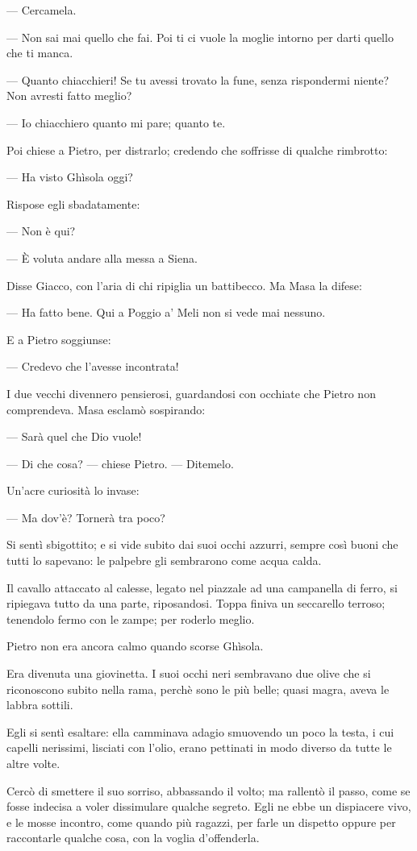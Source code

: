 — Cercamela.

— Non sai mai quello che fai. Poi ti ci vuole la moglie intorno per darti quello che ti manca.

— Quanto chiacchieri! Se tu avessi trovato la fune, senza rispondermi niente? Non avresti fatto meglio?

— Io chiacchiero quanto mi pare; quanto te.

Poi chiese a Pietro, per distrarlo; credendo che soffrisse di qualche rimbrotto:

— Ha visto Ghìsola oggi?

Rispose egli sbadatamente:

— Non è qui?

— È voluta andare alla messa a Siena.

Disse Giacco, con l’aria di chi ripiglia un battibecco. Ma Masa la difese:

— Ha fatto bene. Qui a Poggio a’ Meli non si vede mai nessuno.

E a Pietro soggiunse:

— Credevo che l’avesse incontrata!

I due vecchi divennero pensierosi, guardandosi con occhiate che Pietro non comprendeva. Masa esclamò sospirando:

— Sarà quel che Dio vuole!

— Di che cosa? — chiese Pietro. — Ditemelo.

Un’acre curiosità lo invase:

— Ma dov’è? Tornerà tra poco?

Si sentì sbigottito; e si vide subito dai suoi occhi azzurri, sempre così buoni che tutti lo sapevano: le palpebre gli sembrarono come acqua calda.

Il cavallo attaccato al calesse, legato nel piazzale ad una campanella di ferro, si ripiegava tutto da una parte, riposandosi. Toppa finiva un seccarello terroso; tenendolo fermo con le zampe; per roderlo meglio.

Pietro non era ancora calmo quando scorse Ghìsola.

Era divenuta una giovinetta. I suoi occhi neri sembravano due olive che si riconoscono subito nella rama, perchè sono le più belle; quasi magra, aveva le labbra sottili.

Egli si sentì esaltare: ella camminava adagio smuovendo un poco la testa, i cui capelli nerissimi, lisciati con l’olio, erano pettinati in modo diverso da tutte le altre volte.

Cercò di smettere il suo sorriso, abbassando il volto; ma rallentò il passo, come se fosse indecisa a voler dissimulare qualche segreto. Egli ne ebbe un dispiacere vivo, e le mosse incontro, come quando più ragazzi, per farle un dispetto oppure per raccontarle qualche cosa, con la voglia d’offenderla.


